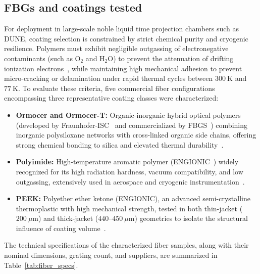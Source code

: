 \documentclass[12pt]{article}
\begin{document}
\subsection{FBGs and coatings tested}
\label{subsec:fibers}

For deployment in large-scale noble liquid time projection chambers such as DUNE, coating selection is constrained by strict chemical purity and cryogenic resilience. Polymers must exhibit negligible outgassing of electronegative contaminants (such as $\text{O}_2$ and $\text{H}_2\text{O}$) to prevent the attenuation of drifting ionization electrons~\cite{Acciarri2020ProtoDUNE}, while maintaining high mechanical adhesion to prevent micro-cracking or delamination under rapid thermal cycles between $300~\text{K}$ and $77~\text{K}$. To evaluate these criteria, five commercial fiber configurations encompassing three representative coating classes were characterized:
\begin{itemize}
    \item \textbf{Ormocer and Ormocer-T:} Organic-inorganic hybrid optical polymers (developed by Fraunhofer-ISC~\cite{} and commercialized by FBGS~\cite{}) combining inorganic polysiloxane networks with cross-linked organic side chains, offering strong chemical bonding to silica and elevated thermal durability~\cite{Popall1998}.
    \item \textbf{Polyimide:} High-temperature aromatic polymer (ENGIONIC~\cite{}) widely recognized for its high radiation hardness, vacuum compatibility, and low outgassing, extensively used in aerospace and cryogenic instrumentation~\cite{Zhao2007}.
    \item \textbf{PEEK:} Polyether ether ketone (ENGIONIC), an advanced semi-crystalline thermoplastic with high mechanical strength, tested in both thin-jacket ($200~\mu\text{m}$) and thick-jacket ($440$--$450~\mu\text{m}$) geometries to isolate the structural influence of coating volume~\cite{NIST_CryoMaterials,Rajan2013}.
\end{itemize}

The technical specifications of the characterized fiber samples, along with their nominal dimensions, grating count, and suppliers, are summarized in Table~\ref{tab:fiber_specs}.
\end{document}

